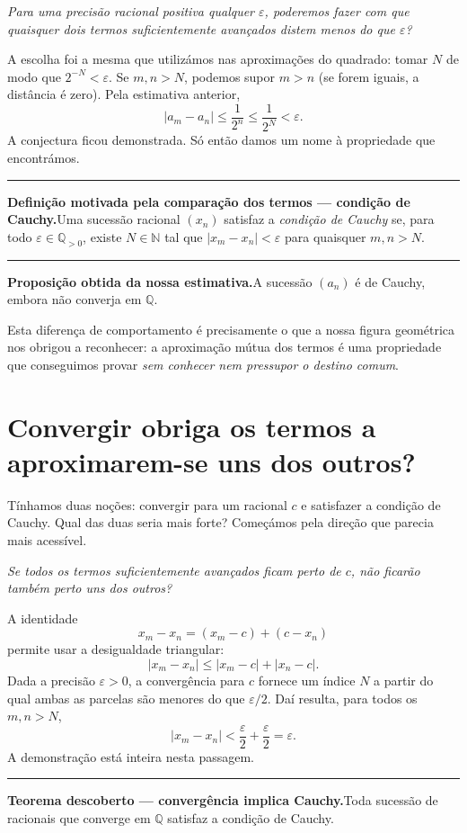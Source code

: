 \documentclass[11pt,a4paper]{article}
\newcommand{\Q}{\mathbb{Q}}
\newcommand{\N}{\mathbb{N}}
\newcommand{\questao}[1]{\par\medskip\noindent\textit{#1}\par\smallskip}
\newcommand{\assentado}[2]{%
\par\medskip\noindent\begingroup\color{azul}\rule{\linewidth}{0.45pt}\par\smallskip
\noindent\textbf{#1.}\enspace #2\par\endgroup\medskip}
\begin{document}
\questao{Para uma precisão racional positiva qualquer $\varepsilon$, poderemos fazer com que quaisquer dois termos suficientemente avançados distem menos do que $\varepsilon$?}

A escolha foi a mesma que utilizámos nas aproximações do quadrado: tomar $N$ de modo que $2^{-N}<\varepsilon$. Se $m,n>N$, podemos supor $m>n$ (se forem iguais, a distância é zero). Pela estimativa anterior,
\[
 |a_m-a_n|\le\frac1{2^n}\le\frac1{2^N}<\varepsilon.
\]
A conjectura ficou demonstrada. Só então damos um nome à propriedade que encontrámos.

\assentado{Definição motivada pela comparação dos termos --- condição de Cauchy}{Uma sucessão racional $(x_n)$ satisfaz a \emph{condição de Cauchy} se, para todo $\varepsilon\in\Q_{>0}$, existe $N\in\N$ tal que $|x_m-x_n|<\varepsilon$ para quaisquer $m,n>N$.}

\assentado{Proposição obtida da nossa estimativa}{A sucessão $(a_n)$ é de Cauchy, embora não converja em $\Q$.}

Esta diferença de comportamento é precisamente o que a nossa figura geométrica nos obrigou a reconhecer: a aproximação mútua dos termos é uma propriedade que conseguimos provar \emph{sem conhecer nem pressupor o destino comum}.

\section{Convergir obriga os termos a aproximarem-se uns dos outros?}

Tínhamos duas noções: convergir para um racional $c$ e satisfazer a condição de Cauchy. Qual das duas seria mais forte? Começámos pela direção que parecia mais acessível.

\questao{Se todos os termos suficientemente avançados ficam perto de $c$, não ficarão também perto uns dos outros?}

A identidade
\[
 x_m-x_n=(x_m-c)+(c-x_n)
\]
permite usar a desigualdade triangular:
\[
 |x_m-x_n|\le |x_m-c|+|x_n-c|.
\]
Dada a precisão $\varepsilon>0$, a convergência para $c$ fornece um índice $N$ a partir do qual ambas as parcelas são menores do que $\varepsilon/2$. Daí resulta, para todos os $m,n>N$,
\[
 |x_m-x_n|<\frac\varepsilon2+\frac\varepsilon2=\varepsilon.
\]
A demonstração está inteira nesta passagem.

\assentado{Teorema descoberto --- convergência implica Cauchy}{Toda sucessão de racionais que converge em $\Q$ satisfaz a condição de Cauchy.}
\end{document}
